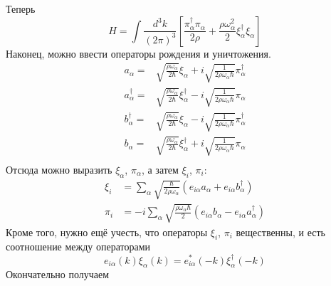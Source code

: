 \documentclass{article}
\begin{document}
Теперь
\begin{equation}
    H = \int \frac{d^3 k}{(2\pi)^3} \left[ \frac{\pi_\alpha^\dagger \pi_\alpha}{2\rho} + 
                         \frac{\rho \omega_\alpha^2}{2} \xi_\alpha^\dagger \xi_\alpha
                                        \right]
\end{equation}
Наконец, можно ввести операторы рождения и уничтожения.
\begin{equation}
    \begin{split}
        a_{\alpha} = & \sqrt{\frac{\rho \omega_\alpha}{2\hbar}}\xi_\alpha + 
                        i\sqrt{\frac{1}{2\rho\omega_\alpha \hbar}}\pi_\alpha^\dagger\\
        a_{\alpha}^\dagger = & \sqrt{\frac{\rho \omega_\alpha}{2\hbar}}\xi_\alpha^\dagger - 
                        i\sqrt{\frac{1}{2\rho\omega_\alpha \hbar}}\pi_\alpha\\
        b_{\alpha}^\dagger= & \sqrt{\frac{\rho \omega_\alpha}{2\hbar}}\xi_\alpha - 
                        i\sqrt{\frac{1}{2\rho\omega_\alpha \hbar}}\pi_\alpha^\dagger\\
        b_{\alpha} = & \sqrt{\frac{\rho \omega_\alpha}{2\hbar}}\xi_\alpha^\dagger + 
                        i\sqrt{\frac{1}{2\rho\omega_\alpha \hbar}}\pi_\alpha\\
    \end{split}
\end{equation}
Отсюда можно выразить $\xi_\alpha$, $\pi_\alpha$, а затем $\xi_i$, $\pi_i$:
\begin{equation}
    \begin{split}
        \xi_i & = \sum_\alpha\sqrt{\frac{\hbar}{2\rho \omega_\alpha}}
                            (e_{i\alpha} a_\alpha + e_{i\alpha} b^\dagger_\alpha)\\
        \pi_i & = -i\sum_\alpha \sqrt{\frac{\rho \omega_\alpha \hbar}{2}}
                            (e_{i\alpha}b_\alpha - e_{i\alpha} a_\alpha^\dagger)
    \end{split}
\end{equation}
Кроме того, нужно ещё учесть, что операторы $\xi_i$, $\pi_i$ вещественны, и есть
соотношение между операторами
\begin{equation}
    e_{i\alpha}(k) \xi_\alpha(k) = e_{i\alpha}^*(-k) \xi_{\alpha}^\dagger(-k)
\end{equation}
Окончательно получаем
\end{document}
